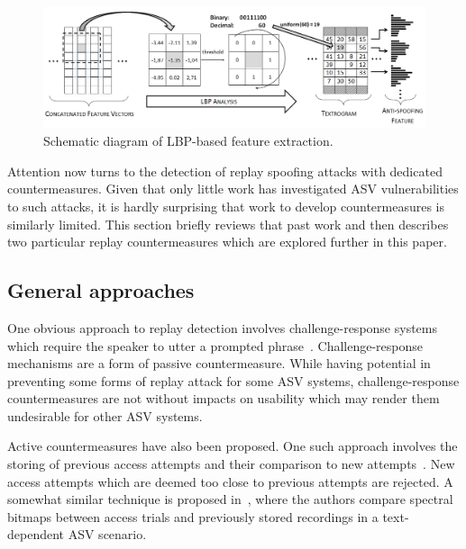 \begin{figure}
	\includegraphics[width=1\linewidth]{Figs/LBP_idea.png}
	\caption{Schematic diagram of LBP-based feature extraction.}
	\label{fig:LBPfeature}
\end{figure}

Attention now turns to the detection of replay spoofing attacks with dedicated countermeasures.  Given that only little work has investigated ASV vulnerabilities to such attacks, it is hardly surprising that work to develop countermeasures is similarly limited.  This section briefly reviews that past work and then describes two particular replay countermeasures which are explored further in this paper.



\subsection{General approaches}

One obvious approach to replay detection involves challenge-response systems which require the speaker to utter a prompted phrase~\cite{Petrovska1998}. 
Challenge-response mechanisms are a form of passive countermeasure.
While having potential in preventing some forms of replay attack for some ASV systems, challenge-response countermeasures are not without impacts on usability which may render them undesirable for other ASV systems.

Active countermeasures have also been proposed.
One such approach involves the storing of previous access attempts and their comparison to new attempts~\cite{Shang2010}.
New access attempts which are deemed too close to previous attempts are rejected.
A somewhat similar technique is proposed in~\cite{Wu2014}, where the authors compare spectral bitmaps between access trials and previously stored recordings in a text-dependent ASV scenario.

